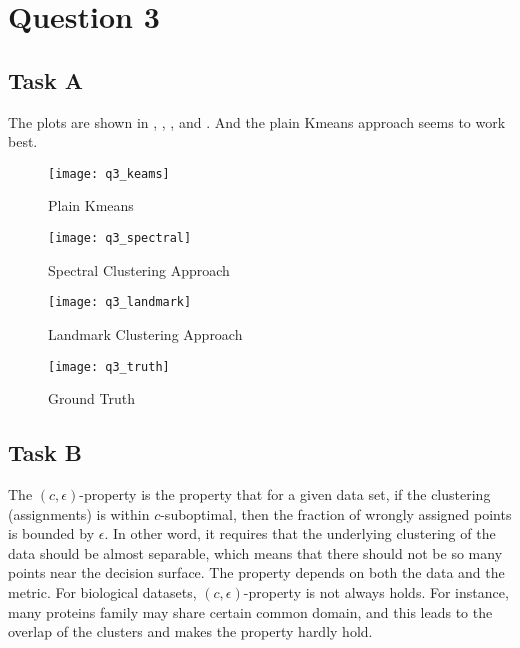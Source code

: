 \documentclass{article}
\begin{document}
\section*{Question 3}

\subsection*{Task A}

  The plots are shown in , , , and . And the plain Kmeans approach seems to work best.

  \begin{figure}[!ht]
    \begin{minipage}{.45\textwidth}
      \centering
      \texttt{[image: q3\_keams]}
      \caption{Plain Kmeans}
      \label{fig:q3a}
    \end{minipage}
    \hfill
    \begin{minipage}{.45\textwidth}
      \centering
      \texttt{[image: q3\_spectral]}
      \caption{Spectral Clustering Approach}
      \label{fig:q3b}
    \end{minipage}
    \vfill
    \begin{minipage}{.45\textwidth}
      \centering
      \texttt{[image: q3\_landmark]}
      \caption{Landmark Clustering Approach}
      \label{fig:q3c}
    \end{minipage}
    \hfill
    \begin{minipage}{.45\textwidth}
      \centering
      \texttt{[image: q3\_truth]}
      \caption{Ground Truth}
      \label{fig:q3d}
    \end{minipage}
  \end{figure}

\subsection*{Task B}

  The $(c, \epsilon)$-property is the property that for a given data set, if the clustering (assignments) is within $c$-suboptimal, then the fraction of wrongly assigned points is bounded by $\epsilon$. In other word, it requires that the underlying clustering of the data should be almost separable, which means that there should not be so many points near the decision surface. The property depends on both the data and the metric. For biological datasets, $(c, \epsilon)$-property is not always holds. For instance, many proteins family may share certain common domain, and this leads to the overlap of the clusters and makes the property hardly hold. 
\end{document}
